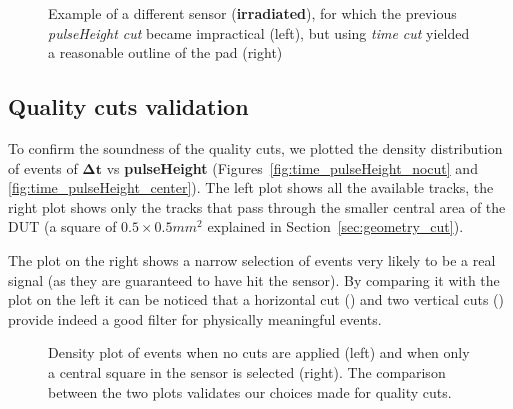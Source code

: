 \begin{figure}[!hb]
    \centering
    \hfill
    \centering
    \caption{Example of a different sensor (\textbf{irradiated}), for which the previous \textit{pulseHeight cut} became impractical (left), but using \textit{time cut} yielded a reasonable outline of the pad (right)}
\end{figure}

\subsection{Quality cuts validation}

To confirm the soundness of the quality cuts, we plotted the density distribution of events of $\boldsymbol{\Delta t}$ vs \textbf{pulseHeight} (Figures~\ref{fig:time_pulseHeight_nocut} and \ref{fig:time_pulseHeight_center}). The left plot shows all the available tracks, the right plot shows only the tracks that pass through the smaller central area of the DUT (a square of \(0.5\times0.5\si{mm^2}\) explained in Section~\ref{sec:geometry_cut}).

The plot on the right shows a narrow selection of events very likely to be a real signal (as they are guaranteed to have hit the sensor). By comparing it with the plot on the left it can be noticed that a horizontal cut () and two vertical cuts () provide indeed a good filter for physically meaningful events. 


\begin{figure}[!ht]
    \centering
    \hfill
    \centering
    \caption{Density plot of events when no cuts are applied (left) and when only a central square in the sensor is selected (right). The comparison between the two plots validates our choices made for quality cuts.}
\end{figure}


